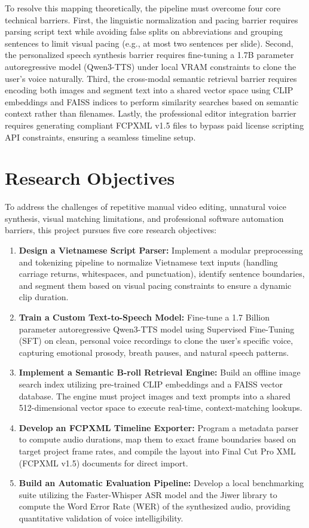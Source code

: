 \documentclass[a4paper,12pt]{report}
\begin{document}
To resolve this mapping theoretically, the pipeline must overcome four core technical barriers. First, the linguistic normalization and pacing barrier requires parsing script text while avoiding false splits on abbreviations and grouping sentences to limit visual pacing (e.g., at most two sentences per slide). Second, the personalized speech synthesis barrier requires fine-tuning a 1.7B parameter autoregressive model (Qwen3-TTS) under local VRAM constraints to clone the user's voice naturally. Third, the cross-modal semantic retrieval barrier requires encoding both images and segment text into a shared vector space using CLIP embeddings and FAISS indices to perform similarity searches based on semantic context rather than filenames. Lastly, the professional editor integration barrier requires generating compliant FCPXML v1.5 files to bypass paid license scripting API constraints, ensuring a seamless timeline setup.
\newpage

\section{Research Objectives}
To address the challenges of repetitive manual video editing, unnatural voice synthesis, visual matching limitations, and professional software automation barriers, this project pursues five core research objectives:
\begin{enumerate}
    \item \textbf{Design a Vietnamese Script Parser:} Implement a modular preprocessing and tokenizing pipeline to normalize Vietnamese text inputs (handling carriage returns, whitespaces, and punctuation), identify sentence boundaries, and segment them based on visual pacing constraints to ensure a dynamic clip duration.
    \item \textbf{Train a Custom Text-to-Speech Model:} Fine-tune a 1.7 Billion parameter autoregressive Qwen3-TTS model using Supervised Fine-Tuning (SFT) on clean, personal voice recordings to clone the user's specific voice, capturing emotional prosody, breath pauses, and natural speech patterns.
    \item \textbf{Implement a Semantic B-roll Retrieval Engine:} Build an offline image search index utilizing pre-trained CLIP embeddings and a FAISS vector database. The engine must project images and text prompts into a shared 512-dimensional vector space to execute real-time, context-matching lookups.
    \item \textbf{Develop an FCPXML Timeline Exporter:} Program a metadata parser to compute audio durations, map them to exact frame boundaries based on target project frame rates, and compile the layout into Final Cut Pro XML (FCPXML v1.5) documents for direct import.
    \item \textbf{Build an Automatic Evaluation Pipeline:} Develop a local benchmarking suite utilizing the Faster-Whisper ASR model and the Jiwer library to compute the Word Error Rate (WER) of the synthesized audio, providing quantitative validation of voice intelligibility.
\end{enumerate}
\end{document}
